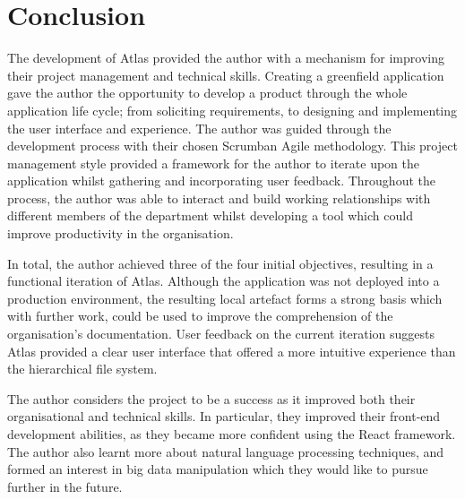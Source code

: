 \documentclass{article}
\begin{document}
\begin{table}[]
\centering
\small
\caption{Potential future functional requirements to be implemented into Atlas.}
\label{tab:my-table}
\end{table}

\newpage
\section{Conclusion}

The development  of Atlas provided the author with a mechanism for improving their project management and technical skills. Creating a greenfield application gave the author the opportunity to develop a product through the whole application life cycle; from soliciting requirements, to designing and implementing the user interface and experience. The author was guided through the development process with their chosen Scrumban Agile methodology. This project management style provided a framework for the author to iterate upon the application whilst gathering and incorporating user feedback. Throughout the process, the author was able to interact and build working relationships with different members of the department whilst developing a tool which could improve productivity in the organisation. 

In total, the author achieved three of the four initial objectives, resulting in a functional iteration of Atlas. Although the application was not deployed into a production environment, the resulting local artefact forms a strong basis which with further work, could be used to improve the comprehension of the organisation's documentation. User feedback on the current iteration suggests Atlas provided a clear user interface that offered a more intuitive experience than the hierarchical file system.

The author considers the project to be a success as it improved both their organisational and technical skills. In particular, they improved their front-end development abilities, as they became more confident using the React framework. The author also learnt more about natural language processing techniques, and formed an interest in big data manipulation which they would like to pursue further in the future.
\end{document}

